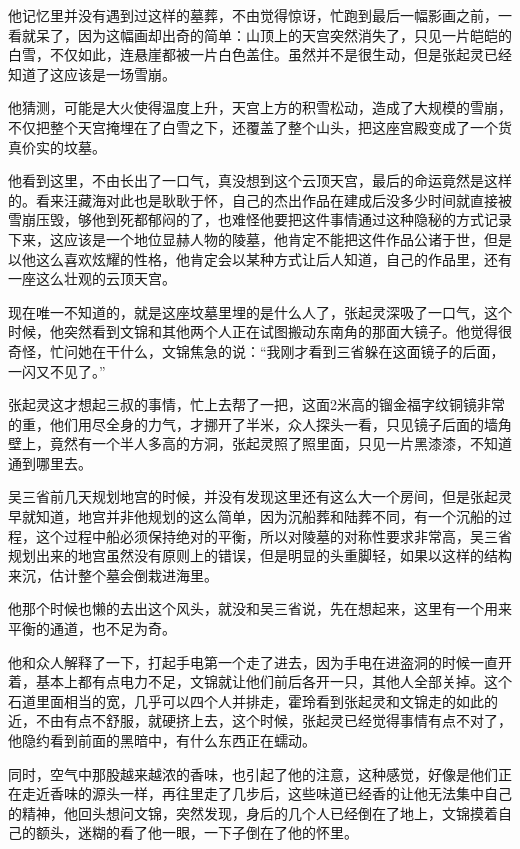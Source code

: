 他记忆里并没有遇到过这样的墓葬，不由觉得惊讶，忙跑到最后一幅影画之前，一看就呆了，因为这幅画却出奇的简单：山顶上的天宫突然消失了，只见一片皑皑的白雪，不仅如此，连悬崖都被一片白色盖住。虽然并不是很生动，但是张起灵已经知道了这应该是一场雪崩。

他猜测，可能是大火使得温度上升，天宫上方的积雪松动，造成了大规模的雪崩，不仅把整个天宫掩埋在了白雪之下，还覆盖了整个山头，把这座宫殿变成了一个货真价实的坟墓。

他看到这里，不由长出了一口气，真没想到这个云顶天宫，最后的命运竟然是这样的。看来汪藏海对此也是耿耿于怀，自己的杰出作品在建成后没多少时间就直接被雪崩压毁，够他到死都郁闷的了，也难怪他要把这件事情通过这种隐秘的方式记录下来，这应该是一个地位显赫人物的陵墓，他肯定不能把这件作品公诸于世，但是以他这么喜欢炫耀的性格，他肯定会以某种方式让后人知道，自己的作品里，还有一座这么壮观的云顶天宫。

现在唯一不知道的，就是这座坟墓里埋的是什么人了，张起灵深吸了一口气，这个时候，他突然看到文锦和其他两个人正在试图搬动东南角的那面大镜子。他觉得很奇怪，忙问她在干什么，文锦焦急的说：“我刚才看到三省躲在这面镜子的后面，一闪又不见了。”

张起灵这才想起三叔的事情，忙上去帮了一把，这面2米高的镏金福字纹铜镜非常的重，他们用尽全身的力气，才挪开了半米，众人探头一看，只见镜子后面的墙角壁上，竟然有一个半人多高的方洞，张起灵照了照里面，只见一片黑漆漆，不知道通到哪里去。

吴三省前几天规划地宫的时候，并没有发现这里还有这么大一个房间，但是张起灵早就知道，地宫并非他规划的这么简单，因为沉船葬和陆葬不同，有一个沉船的过程，这个过程中船必须保持绝对的平衡，所以对陵墓的对称性要求非常高，吴三省规划出来的地宫虽然没有原则上的错误，但是明显的头重脚轻，如果以这样的结构来沉，估计整个墓会倒栽进海里。

他那个时候也懒的去出这个风头，就没和吴三省说，先在想起来，这里有一个用来平衡的通道，也不足为奇。

他和众人解释了一下，打起手电第一个走了进去，因为手电在进盗洞的时候一直开着，基本上都有点电力不足，文锦就让他们前后各开一只，其他人全部关掉。这个石道里面相当的宽，几乎可以四个人并排走，霍玲看到张起灵和文锦走的如此的近，不由有点不舒服，就硬挤上去，这个时候，张起灵已经觉得事情有点不对了，他隐约看到前面的黑暗中，有什么东西正在蠕动。

同时，空气中那股越来越浓的香味，也引起了他的注意，这种感觉，好像是他们正在走近香味的源头一样，再往里走了几步后，这些味道已经香的让他无法集中自己的精神，他回头想问文锦，突然发现，身后的几个人已经倒在了地上，文锦摸着自己的额头，迷糊的看了他一眼，一下子倒在了他的怀里。


